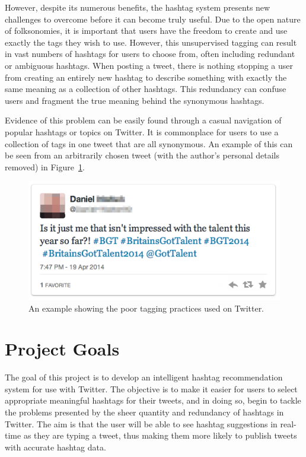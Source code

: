 \documentclass[11pt,a4paper]{report}
\begin{document}
However, despite its numerous benefits, the hashtag system presents new challenges to overcome before it can become truly useful. Due to the open nature of folksonomies, it is important that users have the freedom to create and use exactly the tags they wish to use. However, this unsupervised tagging can result in vast numbers of hashtags for users to choose from, often including redundant or ambiguous hashtags. When posting a tweet, there is nothing stopping a user from creating an entirely new hashtag to describe something with exactly the same meaning as a collection of other hashtags. This redundancy can confuse users and fragment the true meaning behind the synonymous hashtags.

Evidence of this problem can be easily found through a casual navigation of popular hashtags or topics on Twitter. It is commonplace for users to use a collection of tags in one tweet that are all synonymous. An example of this can be seen from an arbitrarily chosen tweet (with the author's personal details removed) in Figure~\ref{fig:badtagging}.

\begin{figure}[htpb]
    \centering
    \includegraphics[width=0.65\linewidth]{badtagging.png}
    \caption{An example showing the poor tagging practices used on Twitter.}
    \label{fig:badtagging}
\end{figure}

\section{Project Goals}

The goal of this project is to develop an intelligent hashtag recommendation system for use with Twitter. The objective is to make it easier for users to select appropriate meaningful hashtags for their tweets, and in doing so, begin to tackle the problems presented by the sheer quantity and redundancy of hashtags in Twitter. The aim is that the user will be able to see hashtag suggestions in real-time as they are typing a tweet, thus making them more likely to publish tweets with accurate hashtag data.
\end{document}
